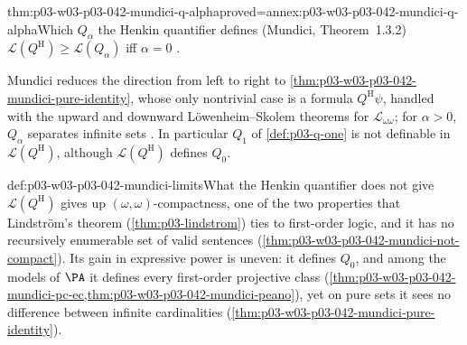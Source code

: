 \begin{hbtheorem}{thm:p03-w03-p03-042-mundici-q-alpha}{proved=annex:p03-w03-p03-042-mundici-q-alpha}{Which \(Q_\alpha\) the Henkin quantifier defines (Mundici, Theorem~1.3.2)}
\(\mathscr L(Q^{\mathrm H})\geq\mathscr L(Q_\alpha)\) iff \(\alpha=0\)
\cite[p.~216]{Mundici1985OtherQuantifiers}.
\end{hbtheorem}

Mundici reduces the direction from left to right to
\cref{thm:p03-w03-p03-042-mundici-pure-identity}, whose only nontrivial
case is a formula \(Q^{\mathrm H}\psi\), handled with the upward and
downward L\"owenheim--Skolem theorems for \(\mathscr L_{\omega\omega}\);
for \(\alpha>0\), \(Q_\alpha\) separates infinite sets
\cite[p.~216]{Mundici1985OtherQuantifiers}.  In particular \(Q_1\) of
\cref{def:p03-q-one} is not definable in \(\mathscr L(Q^{\mathrm H})\),
although \(\mathscr L(Q^{\mathrm H})\) defines \(Q_0\).

\begin{hbwarning}{def:p03-w03-p03-042-mundici-limits}{What the Henkin quantifier does not give}
\(\mathscr L(Q^{\mathrm H})\) gives up \((\omega,\omega)\)-compactness,
one of the two properties that Lindstr\"om's theorem
(\cref{thm:p03-lindstrom}) ties to first-order logic, and it has no
recursively enumerable set of valid sentences
(\cref{thm:p03-w03-p03-042-mundici-not-compact}).  Its gain in expressive
power is uneven: it defines \(Q_0\), and among the models of \(\PA\) it
defines every first-order projective class
(\cref{thm:p03-w03-p03-042-mundici-pc-ec,thm:p03-w03-p03-042-mundici-peano}),
yet on pure sets it sees no difference between infinite cardinalities
(\cref{thm:p03-w03-p03-042-mundici-pure-identity}).
\end{hbwarning}

